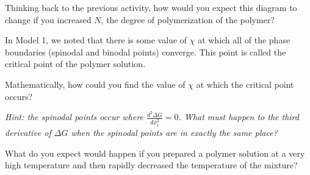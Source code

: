 \begin{activity}
\begin{ctqs}
	\question Thinking back to the previous activity, how would you expect this diagram to change if you increased $N$, the degree of polymerization of the polymer?
		
\end{ctqs}



\begin{exercises}

		\exercise In Model 1, we  noted that there is some value of $\chi$ at which all of the phase boundaries (spinodal and binodal points) converge. This point is called the critical point of the polymer solution.
		
		Mathematically, how could you find the value of $\chi$ at which the critical point occurs?
		
		\emph{Hint: the spinodal points occur where $\frac{d^2\Delta G}{d\phi_1^2} = 0$.  What must happen to the \emph{third} derivative of $\Delta G$ when the spinodal points are in exactly the same place?}
		
		\exercise What do you expect would happen if you prepared a polymer solution at a very high temperature and then rapidly decreased the temperature of the mixture?
		
\end{exercises}
	
\end{activity}